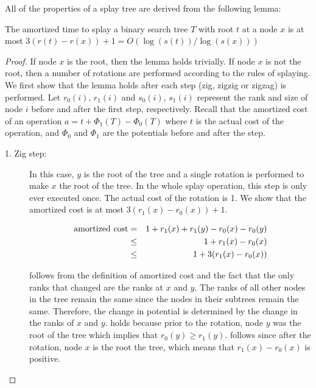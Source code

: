 {All of the properties of a splay tree are derived from the following
lemma:

\begin{lem}
The amortized time to splay a binary search tree $T$ with root $t$ at
a node $x$ is at most $3(r(t)-r(x)) + 1 = O(\log(s(t))/\log(s(x)))$
\end{lem}

\begin{proof}
If node $x$ is the root, then the lemma holds trivially. If node $x$ is not the root, then a number of rotations are performed according to the rules of splaying. We first show that the lemma holds after each step (zig, zigzig or zigzag) is performed. Let $r_0(i)$, $r_1(i)$ and $s_0(i)$, $s_1(i)$ represent the rank and size of node $i$ before and after the first step, respectively. Recall that the amortized cost of an operation $a = t + \Phi_1(T) - \Phi_0(T)$ where $t$ is the actual cost of the operation, and $\Phi_0$ and $\Phi_1$ are the potentials before and after the step.

\begin{description}
\item[1. Zig step:] In this case, $y$ is the root of the tree and a
single rotation is performed to make $x$ the root of the tree. In the
whole splay operation, this step is only ever executed once. The
actual cost of the rotation is 1. We show that the amortized cost is
at most $3(r_1(x) - r_0(x)) + 1$.

\begin{eqnarray}
\mbox{amortized cost} & =  & 1 + r_1(x) + r_1(y) - r_0(x) -r_0(y) 
	\eqlabel{a1}\\
                      &\leq& 1 + r_1(x) - r_0(x) \eqlabel{a2} \\
                      &\leq& 1 + 3(r_1(x) - r_0(x)) \eqlabel{a3}
\end{eqnarray}

 follows from the definition of amortized cost and
the fact that the only ranks that changed are the ranks at $x$ and
$y$. The ranks of all other nodes in the tree remain the same since
the nodes in their subtrees remain the same. Therefore, the change in
potential is determined by the change in the ranks of $x$ and
$y$.  holds because prior to the rotation, node $y$
was the root of the tree which implies that $r_0(y) \geq
r_1(y)$.  follows since after the rotation, node $x$
is the root the tree, which means that $r_1(x) - r_0(x)$ is positive.


\end{description}
\end{proof}}
